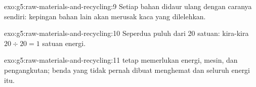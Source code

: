\begin{solution}{exo:g5:raw-materials-and-recycling:9}
Setiap bahan didaur ulang dengan caranya sendiri: kepingan bahan lain
akan merusak kaca yang dilelehkan.
\end{solution}

\begin{solution}{exo:g5:raw-materials-and-recycling:10}
Seperdua puluh dari 20 satuan: kira-kira $20 \div 20 = 1$ satuan
energi.
\end{solution}

\begin{solution}{exo:g5:raw-materials-and-recycling:11}
 tetap memerlukan energi, mesin, dan pengangkutan; benda yang
tidak pernah dibuat menghemat  dan seluruh energi itu.
\end{solution}
